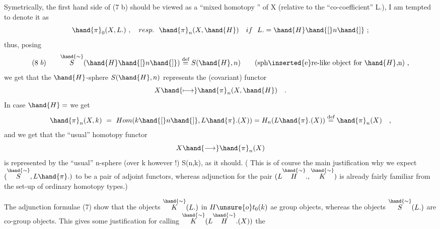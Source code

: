 Symetrically, the first hand side of (7 b) should be viewed as
a ``mixed homotopy '' of X (relative to the ``co-coefficient'' L.),
I am tempted to denote it  as
\[
\hand{\pi}_{0}(X,L.)\ ,\quad resp.\ \ \hand{\pi}_{n}(X,\hand{H})\quad if\ \ L. =\hand{H}\hand{[}n\hand{]}\ ;
\]
thus, posing
\[
(8\ b)\qquad \overset{\hand{\sim}}{S}(\hand{H}\hand{[}n\hand{]}) \overset{\text{def}}{=} S(\hand{H},n) \qquad \text{(sph\inserted{e}re-like object for $\hand{H}$,n) ,}
\]
we get that the $\hand{H}$-sphere $S(\hand{H},n)$  represents the (covariant) functor 
\[
X \hand{\longmapsto} \hand{\pi}_{n}(X,\hand{H}) \quad .
\]
In case $\hand{H}=$\hand{,} we get
\[
\hand{\pi}_{n}(X,k) \ = \ Hom(k\hand{[}n\hand{]},L\hand{\pi}.(X)) = H_{n}(L\hand{\pi}.(X)) \overset{\text{def}}{=} \hand{\pi}_{n}(X) \quad ,
\]
and we get that the  ``usual'' homotopy  functor
\[
X \hand{\longrightarrow} \hand{\pi}_{n}(X)
\]
is represented by the ``usual'' n-sphere (over k however !) S(n,k), as
it should. ( This is of course the main justification why we expect
$(\overset{\hand{\sim}}{S},L\hand{\pi}.)$ to be a pair of adjoint functors, whereas adjunction for the
pair $(L\overset{\hand{\sim}}{H}.,\overset{\hand{\sim}}{K})$ is already fairly familiar from the set-up of ordinary
homotopy types.)

The adjunction formulae (7) show that the objects $\overset{\hand{\sim}}{K}(L.)$
in $H\unsure{o}t_{0}(k)$ ae group objects, whereas the objects $\overset{\hand{\sim}}{S}(L.)$ are co-group
objects. This gives some  justification for calling  $\overset{\hand{\sim}}{K}(L\overset{\hand{\sim}}{H}.(X))$ the


